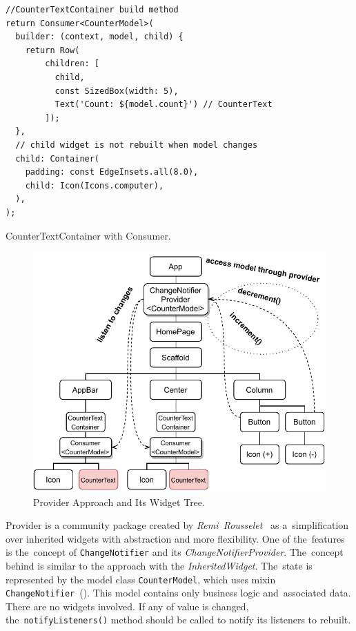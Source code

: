 \begin{listing}[ht]
\begin{verbatim}
//CounterTextContainer build method
return Consumer<CounterModel>(
  builder: (context, model, child) {
    return Row(
        children: [
          child,
          const SizedBox(width: 5),
          Text('Count: ${model.count}') // CounterText
        ]);
  },
  // child widget is not rebuilt when model changes
  child: Container(
    padding: const EdgeInsets.all(8.0),
    child: Icon(Icons.computer),
  ),
);
\end{verbatim}
\caption{CounterTextContainer with Consumer.}
\label{listing:counter-provider-consumer}
\end{listing}

\begin{figure}[ht]
    \centering
    \includegraphics[width=0.75\linewidth]{img/flutter/counter-provider.pdf}
    \caption{Provider Approach and Its Widget Tree.}
    \label{fig:counter-app-provider}
\end{figure}

Provider is a community package created by \textit{Remi~Rousselet}~\cite{package-provider} as a~simplification over inherited widgets with abstraction and more flexibility. One of the~features is the~concept of \verb|ChangeNotifier| and its \textit{ChangeNotifierProvider}. The~concept behind is similar to the approach with the \textit{InheritedWidget}. The~state is represented by the model class \verb|CounterModel|, which uses mixin \verb|ChangeNotifier|~(). This model contains only business logic and~associated data. There are no widgets involved. If any of value is changed, the~\verb|notifyListeners()| method should be called to notify its listeners to rebuilt.


